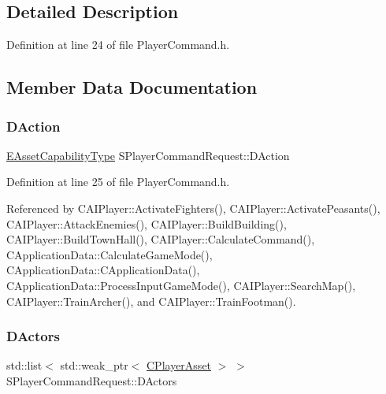 \subsection{Detailed Description}


Definition at line 24 of file Player\+Command.\+h.



\subsection{Member Data Documentation}
\hypertarget{structSPlayerCommandRequest_a80897bbccf2c4e0b148a7aa815a926c6}{}\label{structSPlayerCommandRequest_a80897bbccf2c4e0b148a7aa815a926c6} 
\subsubsection{\texorpdfstring{D\+Action}{DAction}}
{\footnotesize\ttfamily \hyperlink{GameDataTypes_8h_a35b98ce26aca678b03c6f9f76e4778ce}{E\+Asset\+Capability\+Type} S\+Player\+Command\+Request\+::\+D\+Action}



Definition at line 25 of file Player\+Command.\+h.



Referenced by C\+A\+I\+Player\+::\+Activate\+Fighters(), C\+A\+I\+Player\+::\+Activate\+Peasants(), C\+A\+I\+Player\+::\+Attack\+Enemies(), C\+A\+I\+Player\+::\+Build\+Building(), C\+A\+I\+Player\+::\+Build\+Town\+Hall(), C\+A\+I\+Player\+::\+Calculate\+Command(), C\+Application\+Data\+::\+Calculate\+Game\+Mode(), C\+Application\+Data\+::\+C\+Application\+Data(), C\+Application\+Data\+::\+Process\+Input\+Game\+Mode(), C\+A\+I\+Player\+::\+Search\+Map(), C\+A\+I\+Player\+::\+Train\+Archer(), and C\+A\+I\+Player\+::\+Train\+Footman().

\hypertarget{structSPlayerCommandRequest_aa37fc01519676345703d78b9f573894a}{}\label{structSPlayerCommandRequest_aa37fc01519676345703d78b9f573894a} 
\subsubsection{\texorpdfstring{D\+Actors}{DActors}}
{\footnotesize\ttfamily std\+::list$<$ std\+::weak\+\_\+ptr$<$ \hyperlink{classCPlayerAsset}{C\+Player\+Asset} $>$ $>$ S\+Player\+Command\+Request\+::\+D\+Actors}



